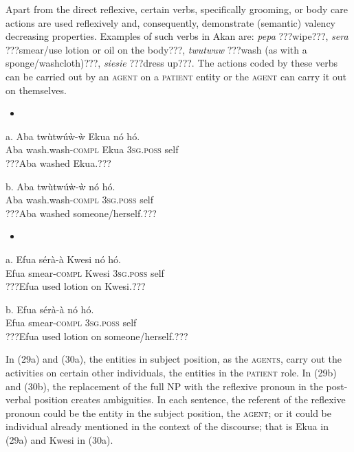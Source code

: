 \documentclass[output=paper]{langsci/langscibook}
\begin{document}
Apart from the direct reflexive, certain verbs, specifically grooming, or body care actions \citep{Kemmer1993} are used reflexively and, consequently, demonstrate (semantic) valency decreasing properties. Examples of such verbs in Akan are: \emph{pepa} ???wipe???, \emph{sera} ???smear/use lotion or oil on the body???, \emph{twutwuw} ???wash (as with a sponge/washcloth)???, \emph{siesie} ???dress up???. The actions coded by these verbs can be carried out by an \textsc{agent} on a \textsc{patient} entity or the \textsc{agent} can carry it out on themselves. 

\begin{itemize}
\item \end{itemize}
\gll a.  Aba  tw\`{u}tw\'{u}\`{w}-\`{w}    Ekua  n\'{o}    h\'{o}.\\
       Aba  wash.wash-\textsc{compl}  Ekua  \textsc{3sg.poss}  self\\
\glt   ???Aba washed Ekua.???
\z

\gll  b.  Aba  tw\`{u}tw\'{u}\`{w}-\`{w}    n\'{o}    h\'{o}.\\
       Aba  wash.wash-\textsc{compl}  \textsc{3sg.poss}  self\\
\glt   ???Aba washed someone/herself.???
\z

\begin{itemize}
\item \end{itemize}
\gll a.  Efua  s\'{e}r\`{a}-\`{a}    Kwesi    n\'{o}    h\'{o}.\\
       Efua  smear-\textsc{compl}  Kwesi    \textsc{3sg.poss}  self\\
\glt   ???Efua used lotion on Kwesi.???
\z

\gll  b.  Efua  s\'{e}r\`{a}-\`{a}    n\'{o}    h\'{o}.\\
       Efua  smear-\textsc{compl}  \textsc{3sg.poss}  self\\
\glt   ???Efua used lotion on someone/herself.???
\z

In (29a) and (30a), the entities in subject position, as the \textsc{agents}, carry out the activities on certain other individuals, the entities in the \textsc{patient} role. In (29b) and (30b), the replacement of the full NP with the reflexive pronoun in the post-verbal position creates ambiguities. In each sentence, the referent of the reflexive pronoun could be the entity in the subject position, the \textsc{agent}; or it could be individual already mentioned in the context of the discourse; that is Ekua in (29a) and Kwesi in (30a).
\end{document}
